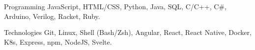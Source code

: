 

\begin{cvskills}

  \cvskill
    {Programming} %
    {JavaScript, HTML/CSS, Python, Java, SQL, C/C++, C\#,  Arduino, Verilog, Racket, Ruby.} %

  \cvskill
    {Technologies} %
    {Git, Linux, Shell (Bash/Zsh), Angular, React, React Native, Docker, K8s, Express, npm, NodeJS, Svelte.} %


\end{cvskills}
